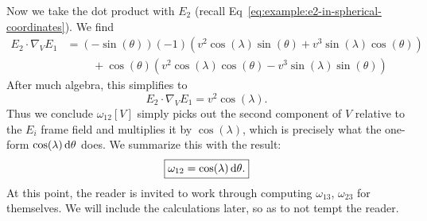 Now we take the dot product with $E_{2}$ (recall
Eq~\eqref{eq:example:e2-in-spherical-coordinates}).
We find
\begin{equation}
  \begin{split}
E_{2}\cdot\nabla_{V}E_{1}&=
(-\sin(\theta))(-1)\left(v^{2}\cos(\lambda)\sin(\theta)+v^{3}\sin(\lambda)\cos(\theta)\right)\\
&\phantom{=}\quad+ \cos(\theta)\left(v^{2}\cos(\lambda)\cos(\theta)-v^{3}\sin(\lambda)\sin(\theta)\right)
  \end{split}
\end{equation}
After much algebra, this simplifies to
\begin{equation}
E_{2}\cdot\nabla_{V}E_{1} = v^{2}\cos(\lambda).
\end{equation}
Thus we conclude $\omega_{12}[V]$ simply picks out the second component
of $V$ relative to the $E_{i}$ frame field and multiplies it by
$\cos(\lambda)$, which is precisely what the one-form
$\cos(\lambda)\,\mathrm{d}\theta$ does. We summarize this with the result:
\begin{equation}
\boxed{\omega_{12}=\cos(\lambda)\,\mathrm{d}\theta.}
\end{equation}
At this point, the reader is invited to work through computing
$\omega_{13}$, $\omega_{23}$ for themselves. We will include the
calculations later, so as to not tempt the reader.

